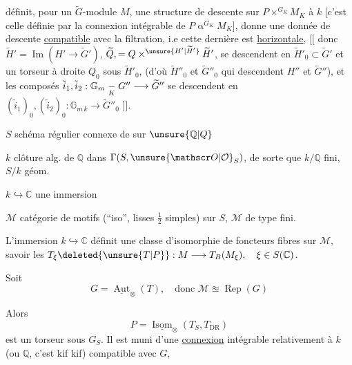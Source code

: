   définit, pour un $\widetilde G$-module $M$, une structure de descente sur $P\mathbin{\times}^{G_K}M_K$ à $k$\unsure{,|;} [c'est celle définie par la connexion intégrable de $P\mathbin{\alpha}^{G_K}M_K$], donne une donnée de descente \uline{compatible} avec la filtration, i.e cette dernière est \uline{horizontale}, $\bigl[\!\bigl[$ donc  $\widetilde H'=\operatorname{Im}(H'\longrightarrow\widetilde G')$, $\widetilde Q,=Q\mathbin{\times}^{\unsure{H'|\widetilde H'}}\widetilde H'$, se descendent  en $\widetilde H'_0\subset\widetilde G'$ et un torseur à droite $Q_0$ sous $\widetilde H'_0$,  (d'où $\widetilde H''_0$ et $\widetilde G''_0$ qui descendent $H''$ et $\widetilde G''$), et  les composés $\tilde i_1,\tilde i_2:\mathbb G_m\underset K{\relbar}G''\longrightarrow\widetilde G''$ se descendent en $(\tilde i_1)_0,(\tilde i_2)_0:\mathbb G_{m\,k}\longrightarrow\widetilde G''_0$ $\bigr]\!\bigr]$.


$S$ schéma régulier connexe de  sur $\unsure{\mathbb Q|Q}$

$k$ clôture alg. de $\mathbb Q$ dans $\Gamma(S,\unsure{\mathscr O|\mathcal O}_S)$, de sorte que $k/\mathbb Q$ fini, $S/k$ géom. 

$k\hookrightarrow\mathbb C$ une immersion

$\mathcal M$ catégorie de motifs (``iso'', lisses $\frac12$ simples) sur $S$, $\mathcal M$ de type fini.

L'immersion $k\hookrightarrow\mathbb C$ définit une classe d'isomorphie de foncteurs fibres sur $\mathcal M$, savoir les $T_{\xi}\deleted{\unsure{T|P}}:M\longrightarrow T_B(M_{\xi}),\quad \xi\in S(\mathbb C)$.

Soit  
\[
G=\underline{\operatorname{Aut}}_{\otimes}(T),\quad\text{donc }\mathcal M\approxeq\operatorname{Rep}(G)
\]

Alors
\[
P=\underline{\operatorname{Isom}}_{\otimes}(T_S,T_{\mathrm{DR}})
\]
est un torseur sous $G_S$. Il est muni d'une \uline{connexion} intégrable relativement à $k$ (ou $\mathbb Q$, c'est kif kif) compatible avec $G$,

